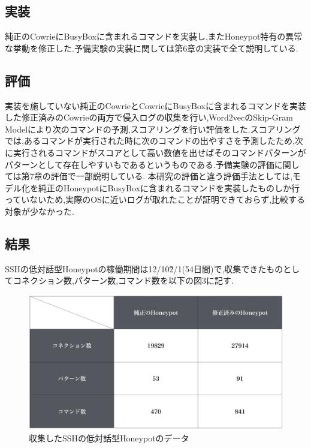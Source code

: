 \subsection{実装}
\label{prex:impl}
純正のCowrieにBusyBoxに含まれるコマンドを実装し,またHoneypot特有の異常な挙動を修正した.予備実験の実装に関しては第6章の実装で全て説明している.

\subsection{評価}
\label{prex:eval}
実装を施していない純正のCowrieとCowrieにBusyBoxに含まれるコマンドを実装した修正済みのCowrieの両方で侵入ログの収集を行い,Word2vecのSkip-Gram Modelにより次のコマンドの予測,スコアリングを行い評価をした.スコアリングでは,あるコマンドが実行された時に次のコマンドの出やすさを予測したため,次に実行されるコマンドがスコアとして高い数値を出せばそのコマンドパターンがパターンとして存在しやすいもであるというものである.予備実験の評価に関しては第7章の評価で一部説明している.
本研究の評価と違う評価手法としては,モデル化を純正のHoneypotにBusyBoxに含まれるコマンドを実装したものしか行っていないため,実際のOSに近いログが取れたことが証明できておらず,比較する対象が少なかった.

\subsection{結果}
\label{prex:conc}
SSHの低対話型Honeypotの稼働期間は12/10\~2/1(54日間)で,収集できたものとしてコネクション数,パターン数,コマンド数を以下の図3に記す.

\begin{figure}[H]
    \centering
    \includegraphics[width=1.0\textwidth]{figures/term.png}
    \caption{収集したSSHの低対話型Honeypotのデータ}
    \label{fig:evo}
\end{figure}

